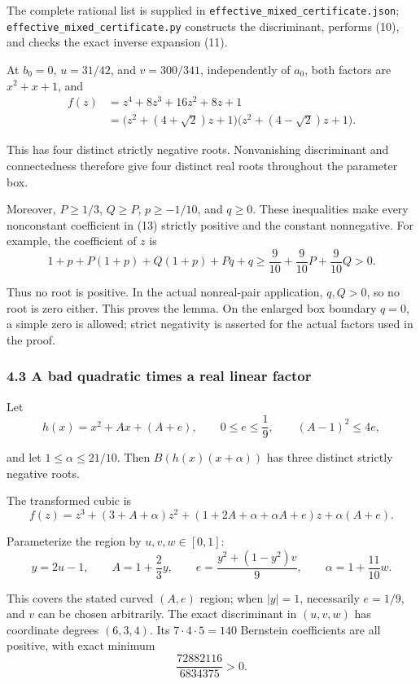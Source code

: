 \documentclass[
  11pt,
  a4paper,
]{article}
\begin{document}
The complete rational list is supplied in
\texttt{\nolinkurl{effective_mixed_certificate.json}};
\texttt{\nolinkurl{effective_mixed_certificate.py}} constructs the
discriminant, performs (10), and checks the exact inverse expansion
(11).

At \(b_0=0\), \(u=31/42\), and \(v=300/341\), independently of \(a_0\),
both factors are \(x^2+x+1\), and
\nopagebreak
\[
\begin{aligned}
f(z)&=z^4+8z^3+16z^2+8z+1\\
&=\bigl(z^2+(4+\sqrt2)z+1\bigr)
\bigl(z^2+(4-\sqrt2)z+1\bigr).
\end{aligned}\tag{15}
\]

This has four distinct strictly negative roots. Nonvanishing
discriminant and connectedness therefore give four distinct real roots
throughout the parameter box.

Moreover, \(P\geq1/3\), \(Q\geq P\), \(p\geq-1/10\), and \(q\geq0\).
These inequalities make every nonconstant coefficient in (13) strictly
positive and the constant nonnegative. For example, the coefficient of
\(z\) is
\nopagebreak
\[
1+p+P(1+p)+Q(1+p)+Pq+q
\geq\frac9{10}+\frac9{10}P+\frac9{10}Q>0.
\]

Thus no root is positive. In the actual nonreal-pair application,
\(q,Q>0\), so no root is zero either. This proves the lemma. On the
enlarged box boundary \(q=0\), a simple zero is allowed; strict
negativity is asserted for the actual factors used in the proof.

\subsubsection{4.3 A bad quadratic times a real linear
factor}\label{a-bad-quadratic-times-a-real-linear-factor}

Let
\nopagebreak
\[
h(x)=x^2+Ax+(A+e),\qquad
0\leq e\leq\frac19,\qquad (A-1)^2\leq4e,
\]

and let \(1\leq\alpha\leq21/10\). Then \(B(h(x)(x+\alpha))\) has three
distinct strictly negative roots.

The transformed cubic is
\nopagebreak
\[
f(z)=z^3+(3+A+\alpha)z^2
+(1+2A+\alpha+\alpha A+e)z+\alpha(A+e).\tag{16}
\]

Parameterize the region by \(u,v,w\in[0,1]\):
\nopagebreak
\[
y=2u-1,\qquad
A=1+\frac23y,\qquad
e=\frac{y^2+(1-y^2)v}{9},\qquad
\alpha=1+\frac{11}{10}w.\tag{17}
\]

This covers the stated curved \((A,e)\) region; when \(|y|=1\),
necessarily \(e=1/9\), and \(v\) can be chosen arbitrarily. The exact
discriminant in \((u,v,w)\) has coordinate degrees \((6,3,4)\). Its
\(7\cdot4\cdot5=140\) Bernstein coefficients are all positive, with
exact minimum
\nopagebreak
\[
\frac{72882116}{6834375}>0.\tag{18}
\]
\end{document}
